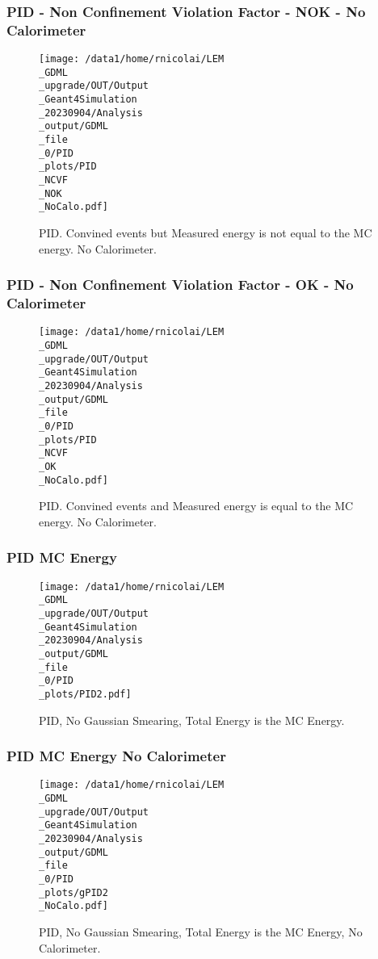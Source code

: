 \documentclass[8pt]{beamer}
\begin{document}
            \begin{frame}
                \frametitle{PID - Non Confinement Violation Factor - NOK - No Calorimeter}
            
        \begin{figure}[h]
            \centering
            \texttt{[image: /data1/home/rnicolai/LEM\\\_GDML\\\_upgrade/OUT/Output\\\_Geant4Simulation\\\_20230904/Analysis\\\_output/GDML\\\_file\\\_0/PID\\\_plots/PID\\\_NCVF\\\_NOK\\\_NoCalo.pdf]}
            \caption{PID. Convined events but Measured energy is not equal to the MC energy. No Calorimeter.}
        \end{figure}
        
            \end{frame}
            
            \begin{frame}
                \frametitle{PID - Non Confinement Violation Factor - OK - No Calorimeter}
            
        \begin{figure}[h]
            \centering
            \texttt{[image: /data1/home/rnicolai/LEM\\\_GDML\\\_upgrade/OUT/Output\\\_Geant4Simulation\\\_20230904/Analysis\\\_output/GDML\\\_file\\\_0/PID\\\_plots/PID\\\_NCVF\\\_OK\\\_NoCalo.pdf]}
            \caption{PID. Convined events and Measured energy is equal to the MC energy. No Calorimeter.}
        \end{figure}
        
            \end{frame}
            
            \begin{frame}
                \frametitle{PID MC Energy}
            
        \begin{figure}[h]
            \centering
            \texttt{[image: /data1/home/rnicolai/LEM\\\_GDML\\\_upgrade/OUT/Output\\\_Geant4Simulation\\\_20230904/Analysis\\\_output/GDML\\\_file\\\_0/PID\\\_plots/PID2.pdf]}
            \caption{PID, No Gaussian Smearing, Total Energy is the MC Energy.}
        \end{figure}
        
            \end{frame}
            
            \begin{frame}
                \frametitle{PID MC Energy No Calorimeter}
            
        \begin{figure}[h]
            \centering
            \texttt{[image: /data1/home/rnicolai/LEM\\\_GDML\\\_upgrade/OUT/Output\\\_Geant4Simulation\\\_20230904/Analysis\\\_output/GDML\\\_file\\\_0/PID\\\_plots/gPID2\\\_NoCalo.pdf]}
            \caption{PID, No Gaussian Smearing, Total Energy is the MC Energy, No Calorimeter.}
        \end{figure}
        
            \end{frame}
            
\end{document}
